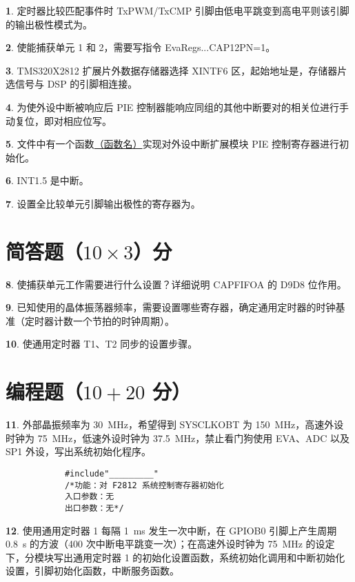 \documentclass{ctexart}
\theoremstyle{definition}
\newtheorem{ti}{}[section]
\def\hua{\uline{\hspace*{4pc}}}
\begin{document}
	\begin{ti}
		定时器比较匹配事件时 TxPWM/TxCMP 引脚由低电平跳变到高电平则该引脚的输出极性模式为\hua。
	\end{ti}

	\begin{ti}
		使能捕获单元 1 和 2，需要写指令 EvaRegs.\hua.\hua.CAP12PN=1。
	\end{ti}

	\begin{ti}
		TMS320X2812 扩展片外数据存储器选择 XINTF6 区，起始地址是\hua，存储器片选信号与 DSP 的\hua 引脚相连接。
	\end{ti}

	\begin{ti}
		为使外设中断被响应后 PIE 控制器能响应同组的其他中断要对\hua 的相关位进行手动复位，即对相应位写\hua。
	\end{ti}

	\begin{ti}
		\hua 文件中有一个函数\uline{\hspace*{4pc}（函数名）}实现对外设中断扩展模块 PIE 控制寄存器进行初始化。
	\end{ti}

	\begin{ti}
		INT1.5 是\hua 中断。
	\end{ti}

	\begin{ti}
		设置全比较单元引脚输出极性的寄存器为\hua。
	\end{ti}

	\section{简答题（$10 \times 3$）分}
	\begin{ti}
		使捕获单元工作需要进行什么设置？详细说明 CAPFIFOA 的 D9D8 位作用。
	\end{ti}

	\begin{ti}
		已知使用的晶体振荡器频率，需要设置哪些寄存器，确定通用定时器的时钟基准（定时器计数一个节拍的时钟周期）。
	\end{ti}

	\begin{ti}
		使通用定时器 T1、T2 同步的设置步骤。
	\end{ti}

	\section{编程题（$10 + 20$ 分）}
	\begin{ti}
		外部晶振频率为 \SI{30}{MHz}，希望得到 SYSCLKOBT 为 \SI{150}{MHz}，高速外设时钟为 \SI{75}{MHz}，低速外设时钟为 \SI{37.5}{MHz}，禁止看门狗使用 EVA、ADC 以及 SP1 外设，写出系统初始化程序。
		\begin{verbatim}
			#include"_________"
			/*功能：对 F2812 系统控制寄存器初始化
			入口参数：无
			出口参数：无*/
		\end{verbatim}
	\end{ti}

	\begin{ti}
		使用通用定时器 1 每隔 \SI{1}{ms} 发生一次中断，在 GPIOB0 引脚上产生周期 \SI{0.8}{s} 的方波（400 次中断电平跳变一次）；在高速外设时钟为 \SI{75}{MHz} 的设定下，分模块写出通用定时器 1 的初始化设置函数，系统初始化调用和中断初始化设置，引脚初始化函数，中断服务函数。
	\end{ti}
\end{document}
